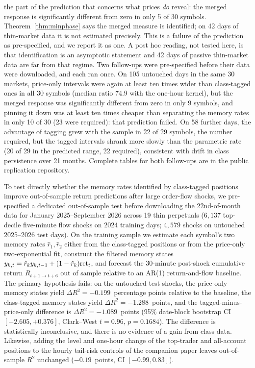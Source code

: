 \documentclass[12pt]{article}
\theoremstyle{definition}
\theoremstyle{remark}
\begin{document}
the part of the prediction that concerns what prices \emph{do} reveal: the merged response is significantly different from zero in only 5 of 30 symbols. Theorem~\ref{thm:minphase} says the merged measure is identified; on 42 days of thin-market data it is not estimated precisely. This is a failure of the prediction as pre-specified, and we report it as one. A post hoc reading, not tested here, is that identification is an asymptotic statement and 42 days of passive thin-market data are far from that regime. Two follow-ups were pre-specified before their data were downloaded, and each ran once. On 105 untouched days in the same 30 markets, price-only intervals were again at least ten times wider than class-tagged ones in all 30 symbols (median ratio 74.9 with the one-hour kernel), but the merged response was significantly different from zero in only 9 symbols, and pinning it down was at least ten times cheaper than separating the memory rates in only 10 of 30 (23 were required): that prediction failed. On 58 further days, the advantage of tagging grew with the sample in 22 of 29 symbols, the number required, but the tagged intervals shrank more slowly than the parametric rate (20 of 29 in the predicted range, 22 required), consistent with drift in class persistence over 21 months. Complete tables for both follow-ups are in the public replication repository.

To test directly whether the memory rates identified by class-tagged positions improve out-of-sample return predictions after large order-flow shocks, we pre-specified a dedicated out-of-sample test before downloading the 22nd-of-month data for January 2025--September 2026 across 19 thin perpetuals ($6{,}137$ top-decile five-minute flow shocks on 2024 training days; $4{,}579$ shocks on untouched 2025--2026 test days). On the training sample we estimate each symbol's two memory rates $\hat r_1,\hat r_2$ either from the class-tagged positions or from the price-only two-exponential fit, construct the filtered memory states $y_{k,t}=\hat r_k y_{k,t-1}+(1-\hat r_k){\rm ret}_t$, and forecast the 30-minute post-shock cumulative return $R_{t+1\to t+6}$ out of sample relative to an AR(1) return-and-flow baseline. The primary hypothesis fails: on the untouched test shocks, the price-only memory states yield $\Delta R^2=-0.199$~percentage points relative to the baseline, the class-tagged memory states yield $\Delta R^2=-1.288$~points, and the tagged-minus-price-only difference is $\Delta R^2=-1.089$~points (95\% date-block bootstrap CI $[-2.605,+0.376]$, Clark--West $t=0.96$, $p=0.1684$). The difference is statistically inconclusive, and there is no evidence of a gain from class data. Likewise, adding the level and one-hour change of the top-trader and all-account positions to the hourly tail-risk controls of the companion paper leaves out-of-sample $R^2$ unchanged ($-0.19$~points, CI $[-0.99,0.83]$).
\end{document}
